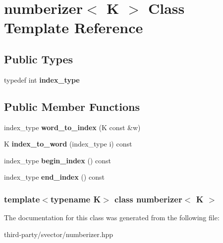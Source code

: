 \hypertarget{classnumberizer}{
\section{numberizer$<$ K $>$ Class Template Reference}
\label{classnumberizer}
}
\subsection*{Public Types}
\begin{DoxyCompactItemize}
\item 
\hypertarget{classnumberizer_abe7a6870680c2d0e1ce7310f9b384bfb}{
typedef int {\bfseries index\_\-type}}
\label{classnumberizer_abe7a6870680c2d0e1ce7310f9b384bfb}

\end{DoxyCompactItemize}
\subsection*{Public Member Functions}
\begin{DoxyCompactItemize}
\item 
\hypertarget{classnumberizer_a1fe363ee20421460304c1c09655ca972}{
index\_\-type {\bfseries word\_\-to\_\-index} (K const \&w)}
\label{classnumberizer_a1fe363ee20421460304c1c09655ca972}

\item 
\hypertarget{classnumberizer_a5805e2159cfb86b532f4f65a478b632f}{
K {\bfseries index\_\-to\_\-word} (index\_\-type i) const }
\label{classnumberizer_a5805e2159cfb86b532f4f65a478b632f}

\item 
\hypertarget{classnumberizer_aab4df02a31746f6afca10c6dbd881321}{
index\_\-type {\bfseries begin\_\-index} () const }
\label{classnumberizer_aab4df02a31746f6afca10c6dbd881321}

\item 
\hypertarget{classnumberizer_a42d4a600fe262be7d13e324bf5afae22}{
index\_\-type {\bfseries end\_\-index} () const }
\label{classnumberizer_a42d4a600fe262be7d13e324bf5afae22}

\end{DoxyCompactItemize}
\subsubsection*{template$<$typename K$>$ class numberizer$<$ K $>$}



The documentation for this class was generated from the following file:\begin{DoxyCompactItemize}
\item 
third-\/party/svector/numberizer.hpp\end{DoxyCompactItemize}
